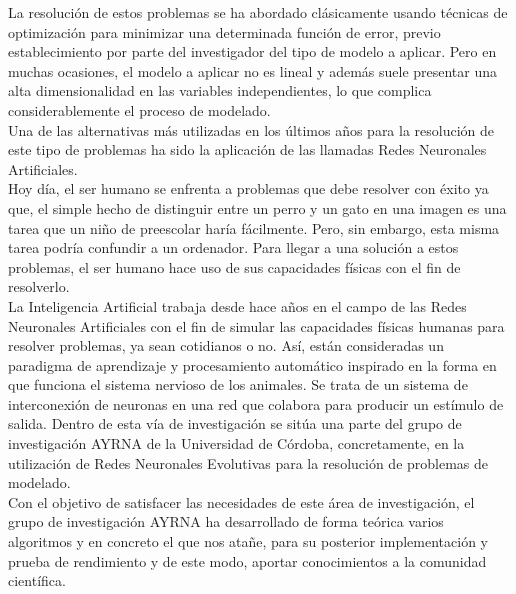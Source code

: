 	La resolución de estos problemas se ha abordado clásicamente usando técnicas de optimización para minimizar una determinada función de error, previo establecimiento por parte del investigador del tipo de modelo a aplicar. Pero en muchas ocasiones, el modelo a aplicar no es lineal y además suele presentar una alta dimensionalidad en las variables independientes, lo que complica considerablemente el proceso de modelado.\\

	Una de las alternativas más utilizadas en los últimos años para la resolución de este tipo de problemas ha sido la aplicación de las llamadas Redes Neuronales Artificiales.\\

	Hoy día, el ser humano se enfrenta a problemas que debe resolver con éxito ya que, el simple hecho de distinguir entre un perro y un gato en una imagen es una tarea que un niño de preescolar haría fácilmente. Pero, sin embargo, esta misma tarea podría confundir a un ordenador. Para llegar a una solución a estos problemas, el ser humano hace uso de sus capacidades físicas con el fin de resolverlo.\\

	La Inteligencia Artificial trabaja desde hace años en el campo de las Redes Neuronales Artificiales con el fin de simular las capacidades físicas humanas para resolver problemas, ya sean cotidianos o no. Así, están consideradas un paradigma de aprendizaje y procesamiento automático inspirado en la forma en que funciona el sistema nervioso de los animales. Se trata de un sistema de interconexión de neuronas en una red que colabora para producir un estímulo de salida. Dentro de esta vía de investigación se sitúa una parte del grupo de investigación AYRNA de la Universidad de Córdoba, concretamente, en la utilización de Redes Neuronales Evolutivas para la resolución de problemas de modelado.\\

	Con el objetivo de satisfacer las necesidades de este área de investigación, el grupo de investigación AYRNA ha desarrollado de forma teórica varios algoritmos y en concreto el que nos atañe, para su posterior implementación y prueba de rendimiento y de este modo, aportar conocimientos a la comunidad científica.
